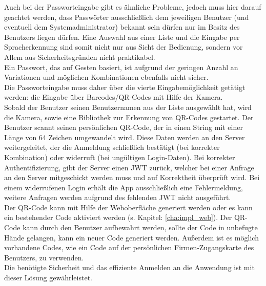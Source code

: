 Auch bei der Passworteingabe gibt es ähnliche Probleme, jedoch muss hier darauf geachtet werden, dass Passwörter ausschließlich dem jeweiligen Benutzer (und eventuell dem Systemadministrator) bekannt sein dürfen \bzw nur im Besitz des Benutzers liegen dürfen. Eine Auswahl aus einer Liste und die Eingabe per Spracherkennung sind somit nicht nur aus Sicht der Bedienung, sondern vor Allem aus Sicherheitsgründen nicht praktikabel.\\
Ein Passwort, das auf Gesten basiert, ist aufgrund der geringen Anzahl an Variationen und möglichen Kombinationen ebenfalls nicht sicher.\\
Die Passworteingabe muss daher über die vierte Eingabemöglichkeit getätigt werden: die Eingabe über Barcodes/QR-Codes mit Hilfe der Kamera.\\

Sobald der Benutzer seinen Benutzernamen aus der Liste ausgewählt hat, wird die Kamera, sowie eine Bibliothek zur Erkennung von QR-Codes gestartet. Der Benutzer scannt seinen persönlichen QR-Code, der in einen String mit einer Länge von 64 Zeichen umgewandelt wird. Diese Daten werden an den Server weitergeleitet, der die Anmeldung schließlich bestätigt (bei korrekter Kombination) oder widerruft (bei ungültigen Login-Daten). Bei korrekter Authentifizierung, gibt der Server einen \ac{JWT} zurück, welcher bei einer Anfrage an den Server mitgeschickt werden muss und auf Korrektheit überprüft wird. Bei einem widerrufenen Login erhält die App ausschließlich eine Fehlermeldung, weitere Anfragen werden aufgrund des fehlenden \ac{JWT} nicht ausgeführt.\\

Der QR-Code kann mit Hilfe der Weboberfläche generiert werden oder es kann ein bestehender Code aktiviert werden (s. Kapitel: \ref{cha:impl_web}). Der QR-Code kann durch den Benutzer aufbewahrt werden, sollte der Code in unbefugte Hände gelangen, kann ein neuer Code generiert werden. Außerdem ist es möglich vorhandene Codes, wie \zB ein Code auf der persönlichen Firmen-Zugangskarte des Benutzers, zu verwenden.\\

Die benötigte Sicherheit und das effiziente Anmelden an die Anwendung ist mit dieser Lösung gewährleistet.


